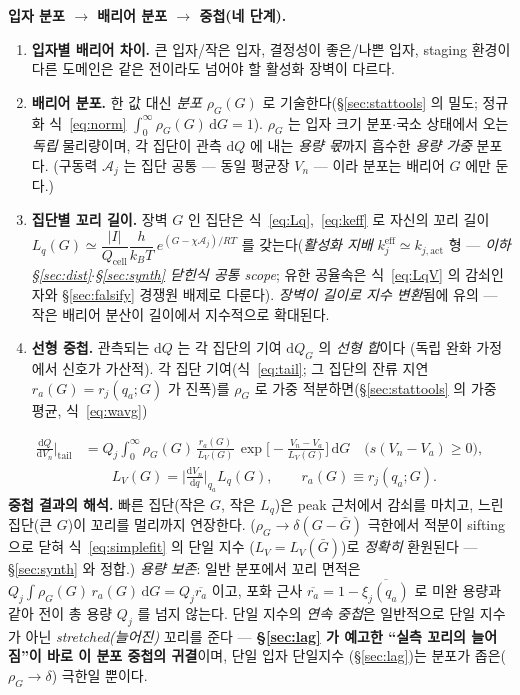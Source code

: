 \documentclass[11pt,a4paper]{article}
\newcommand{\dd}{\mathrm{d}}
\newcommand{\eff}{\mathrm{eff}}
\newcommand{\cell}{\mathrm{cell}}
\begin{document}
\textbf{입자 분포 $\to$ 배리어 분포 $\to$ 중첩(네 단계).}
\begin{enumerate}[label=\textbf{(\alph*)},leftmargin=2.2em,itemsep=2pt]
\item \textbf{입자별 배리어 차이.} 큰 입자/작은 입자, 결정성이 좋은/나쁜 입자, staging 환경이 다른 도메인은
  같은 전이라도 넘어야 할 활성화 장벽이 다르다.
\item \textbf{배리어 분포.} 한 값 대신 \emph{분포} $\rho_G(G)$ 로 기술한다(\S\ref{sec:stattools} 의 밀도;
  정규화 식~\eqref{eq:norm} $\int_0^\infty\rho_G(G)\,\dd G=1$). $\rho_G$ 는 입자 크기 분포$\cdot$국소 상태에서
  오는 \emph{독립} 물리량이며, 각 집단이 관측 $\dd Q$ 에 내는 \emph{용량 몫}까지 흡수한 \emph{용량 가중} 분포다. (구동력 $\mathcal A_j$ 는 집단 공통 —
  동일 평균장 $V_n$ — 이라 분포는 배리어 $G$ 에만 둔다.)
\item \textbf{집단별 꼬리 길이.} 장벽 $G$ 인 집단은 식~\eqref{eq:Lq},~\eqref{eq:keff} 로 자신의 꼬리
  길이 $L_{q}(G)\simeq\dfrac{|I|}{Q_\cell}\dfrac{h}{k_BT}\,e^{(G-\chi\mathcal A_j)/RT}$ 를 갖는다(\emph{활성화 지배}
  $k_j^{\eff}\simeq k_{j,\mathrm{act}}$ 형 — \emph{이하 \S\ref{sec:dist}$\cdot$\S\ref{sec:synth} 닫힌식 공통 scope};
  유한 공율속은 식~\eqref{eq:LqV} 의 감쇠인자와 \S\ref{sec:falsify} 경쟁원 배제로 다룬다). \emph{장벽이 길이로
  지수 변환}됨에 유의 — 작은 배리어 분산이 길이에서 지수적으로 확대된다.
\item \textbf{선형 중첩.} 관측되는 $\dd Q$ 는 각 집단의 기여 $\dd Q_G$ 의 \emph{선형 합}이다
  (독립 완화 가정에서 신호가 가산적). 각 집단 기여(식~\eqref{eq:tail}; 그 집단의 잔류 지연 $r_a(G)=r_j(q_a;G)$ 가
  진폭)를 $\rho_G$ 로 가중 적분하면(\S\ref{sec:stattools} 의 가중 평균, 식~\eqref{eq:wavg})
\end{enumerate}
\begin{equation}
\boxed{\;\begin{aligned}
\frac{\dd Q}{\dd V_n}\Big|_{\text{tail}}&=Q_j\!\int_0^\infty\!\rho_G(G)\,\frac{r_a(G)}{L_V(G)}\,
\exp\!\Big[-\frac{V_n-V_a}{L_V(G)}\Big]\,\dd G\quad\big(s(V_n-V_a)\ge0\big),\\[2pt]
&\qquad L_V(G)=\Big|\frac{\dd V_n}{\dd q}\Big|_{q_a}\!\!L_q(G),\qquad r_a(G)\equiv r_j(q_a;G).
\end{aligned}\;}
\label{eq:superpose}
\end{equation}
\textbf{중첩 결과의 해석.} 빠른 집단(작은 $G$, 작은 $L_q$)은 peak 근처에서 감쇠를 마치고, 느린 집단(큰 $G$)이 꼬리를 멀리까지
연장한다. ($\rho_G\to\delta(G-\bar G)$ 극한에서 적분이 sifting 으로 닫혀 식~\eqref{eq:simplefit} 의 단일 지수
($L_V=L_V(\bar G)$)로 \emph{정확히} 환원된다 — \S\ref{sec:synth} 와 정합.) \emph{용량 보존}: 일반 분포에서 꼬리 면적은
$Q_j\!\int\!\rho_G(G)\,r_a(G)\,\dd G=Q_j\overline{r_a}$ 이고, 포화 근사 $\overline{r_a}=1-\overline{\xi_j(q_a)}$ 로 미완 용량과
같아 전이 총 용량 $Q_j$ 를 넘지 않는다. 단일 지수의 \emph{연속 중첩}은 일반적으로
단일 지수가 아닌 \emph{stretched(늘어진)} 꼬리를 준다 \cite{lindsey1980,johnston2006,svare2000} —
\textbf{\S\ref{sec:lag} 가 예고한 ``실측 꼬리의 늘어짐''이 바로 이 분포 중첩의 귀결}이며, 단일 입자 단일지수
(\S\ref{sec:lag})는 분포가 좁은($\rho_G\to\delta$) 극한일 뿐이다.
\end{document}
